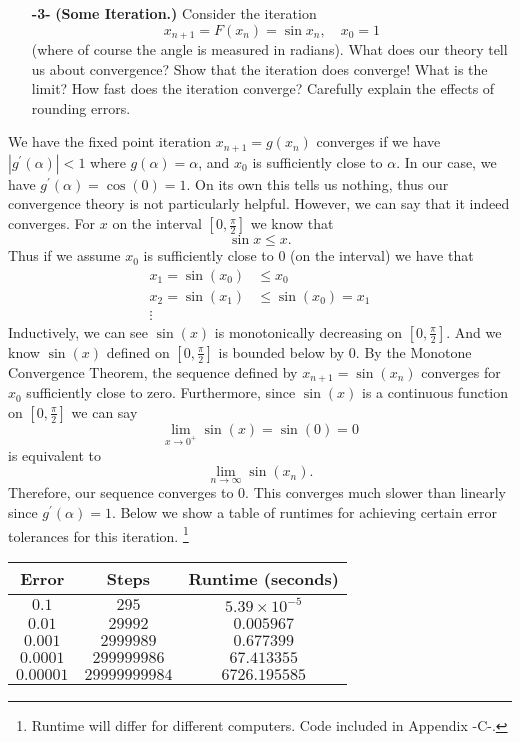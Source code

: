 \documentclass[11pt]{article}
\theoremstyle{definition}
\newcommand{\1}[1]{\mathbf{1} \left \{ #1 \right \}}
\begin{document}
\begin{itemize}
    \item[{\textbf{-3-}}] \textbf{(Some Iteration.)}  Consider the iteration
    \begin{equation}
        x_{n+1} = F(x_n) = \sin x_n, \quad x_0 = 1
    \end{equation}
    (where of course the angle is measured in radians).  What does our theory tell us about convergence? Show that the iteration does converge!  What is the limit?  How fast does the iteration converge?  Carefully explain the effects of rounding errors.
\end{itemize}
We have the fixed point iteration $x_{n+1} = g(x_n)$ converges if we have \(\left|g^{\prime} (\alpha)\right| < 1\) where $g(\alpha) = \alpha$, and $x_0$ is sufficiently close to $\alpha$.  In our case, we have $g^{\prime} (\alpha) = \cos (0) = 1$.  On its own this tells us nothing, thus our convergence theory is not particularly helpful.  However, we can say that it indeed converges.  For $x$ on the interval $[0, \frac{\pi}{2}]$ we know that
\[\sin x \leq x.\]
Thus if we assume $x_0$ is sufficiently close to $0$ (on the interval) we have that
\begin{equation*}
    \begin{split}
        x_1 = \sin (x_0) &\leq x_0 \\
        x_2 = \sin (x_1) &\leq \sin (x_0) = x_1 \\
        \vdots
    \end{split}
\end{equation*}
Inductively, we can see $\sin(x)$ is monotonically decreasing on $[0, \frac{\pi}{2}]$.  And we know $\sin(x)$ defined on $[0, \frac{\pi}{2}]$ is bounded below by $0$.  By the Monotone Convergence Theorem, the sequence defined by $x_{n+1} = \sin(x_n)$ converges for $x_0$ sufficiently close to zero.  Furthermore, since $\sin(x)$ is a continuous function on $[0, \frac{\pi}{2}]$ we can say
\[\lim_{x \rightarrow 0^+} \sin (x) = \sin (0) = 0\]
is equivalent to
\[\lim_{n \rightarrow \infty} \sin (x_n).\]
Therefore, our sequence converges to $0$.  This converges much slower than linearly since $g^{\prime} (\alpha) = 1$.  Below we show a table of runtimes for achieving certain error tolerances for this iteration.  \footnote{Runtime will differ for different computers.  Code included in Appendix -C-.}
\begin{center}
\begin{tabular}{ |c|c|c| }
\hline
Error & Steps & Runtime (seconds) \\
\hline
$0.1$ & $295$ & $5.39 \times 10^{-5}$ \\
$0.01$ & $29992$ & $0.005967$ \\
$0.001$ & $2999989$ & $0.677399$ \\
$0.0001$ & $299999986$ & $67.413355$ \\
$0.00001$ & $29999999984$ & $6726.195585$ \\
\hline
\end{tabular}
\end{center}
\end{document}
